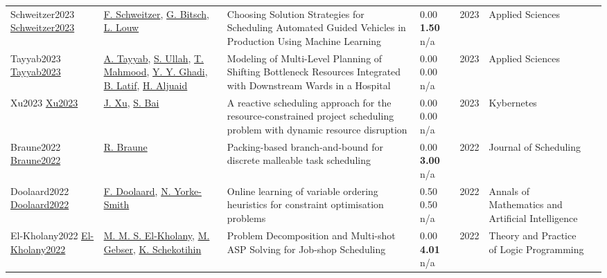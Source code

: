 {\begin{longtable}{p{3cm}p{5cm}p{10cm}p{1cm}rp{2.5cm}l}
Schweitzer2023 \href{http://dx.doi.org/10.3390/app13020806}{Schweitzer2023} & \hyperref[auth:a1592]{F. Schweitzer}, \hyperref[auth:a1593]{G. Bitsch}, \hyperref[auth:a1594]{L. Louw} & \cellcolor{gold!20}Choosing Solution Strategies for Scheduling Automated Guided Vehicles in Production Using Machine Learning & \noindent{}\textcolor{black!50}{0.00} \textbf{1.50} n/a & 2023 & Applied Sciences & \cite{Schweitzer2023}\\
Tayyab2023 \href{http://dx.doi.org/10.3390/app13063616}{Tayyab2023} & \hyperref[auth:a1640]{A. Tayyab}, \hyperref[auth:a1641]{S. Ullah}, \hyperref[auth:a1642]{T. Mahmood}, \hyperref[auth:a1643]{Y. Y. Ghadi}, \hyperref[auth:a1644]{B. Latif}, \hyperref[auth:a1645]{H. Aljuaid} & \cellcolor{gold!20}Modeling of Multi-Level Planning of Shifting Bottleneck Resources Integrated with Downstream Wards in a Hospital & \noindent{}\textcolor{black!50}{0.00} \textcolor{black!50}{0.00} n/a & 2023 & Applied Sciences & \cite{Tayyab2023}\\
Xu2023 \href{http://dx.doi.org/10.1108/k-09-2022-1339}{Xu2023} & \hyperref[auth:a1619]{J. Xu}, \hyperref[auth:a1620]{S. Bai} & A reactive scheduling approach for the resource-constrained project scheduling problem with dynamic resource disruption & \noindent{}\textcolor{black!50}{0.00} \textcolor{black!50}{0.00} n/a & 2023 & Kybernetes & \cite{Xu2023}\\
Braune2022 \href{http://dx.doi.org/10.1007/s10951-022-00750-w}{Braune2022} & \hyperref[auth:a1512]{R. Braune} & \cellcolor{gold!20}Packing-based branch-and-bound for discrete malleable task scheduling & \noindent{}\textcolor{black!50}{0.00} \textbf{3.00} n/a & 2022 & Journal of Scheduling & \cite{Braune2022}\\
Doolaard2022 \href{http://dx.doi.org/10.1007/s10472-022-09816-z}{Doolaard2022} & \hyperref[auth:a1900]{F. Doolaard}, \hyperref[auth:a19]{N. Yorke-Smith} & \cellcolor{gold!20}Online learning of variable ordering heuristics for constraint optimisation problems & \noindent{}0.50 0.50 n/a & 2022 & Annals of Mathematics and Artificial Intelligence & \cite{Doolaard2022}\\
El-Kholany2022 \href{http://dx.doi.org/10.1017/s1471068422000217}{El-Kholany2022} & \hyperref[auth:a1496]{M. M. S. El-Kholany}, \hyperref[auth:a61]{M. Gebser}, \hyperref[auth:a423]{K. Schekotihin} & \cellcolor{gold!20}Problem Decomposition and Multi-shot ASP Solving for Job-shop Scheduling & \noindent{}\textcolor{black!50}{0.00} \textbf{4.01} n/a & 2022 & Theory and Practice of Logic Programming & \cite{El-Kholany2022}\\

\end{longtable}}
